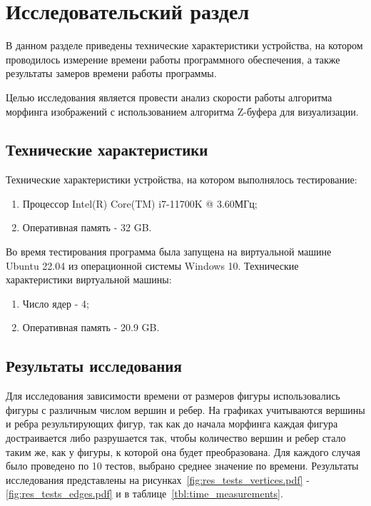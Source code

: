 \chapter{Исследовательский раздел}

В данном разделе приведены технические характеристики устройства, на котором проводилось измерение времени работы программного обеспечения, а также результаты замеров времени работы программы.

Целью исследования является провести анализ скорости работы алгоритма морфинга изображений с использованием алгоритма Z-буфера для визуализации.

\section{Технические характеристики}

Технические характеристики устройства, на котором выполнялось тестирование:
\begin{enumerate}
	\item Процессор Intel(R) Core(TM) i7-11700K @ 3.60МГц;
	\item Оперативная память - 32 GB.
\end{enumerate}

Во время тестирования программа была запущена на виртуальной машине Ubuntu 22.04 из операционной системы Windows 10. 
Технические характеристики виртуальной машины:
\begin{enumerate}
	\item Число ядер - 4;
	\item Оперативная память - 20.9 GB.
\end{enumerate}

\section{Результаты исследования}

Для исследования зависимости времени от размеров фигуры использовались фигуры с различным числом вершин и ребер. 
На графиках учитываются вершины и ребра результирующих фигур, так как до начала морфинга каждая фигура достраивается либо разрушается так, чтобы количество вершин и ребер стало таким же, как у фигуры, к которой она будет преобразована. 
Для каждого случая было проведено по 10 тестов, выбрано среднее значение по времени. 
Результаты исследования представлены на рисунках~\ref{fig:res_tests_vertices.pdf} - \ref{fig:res_tests_edges.pdf} и в таблице~\ref{tbl:time_measurements}.

